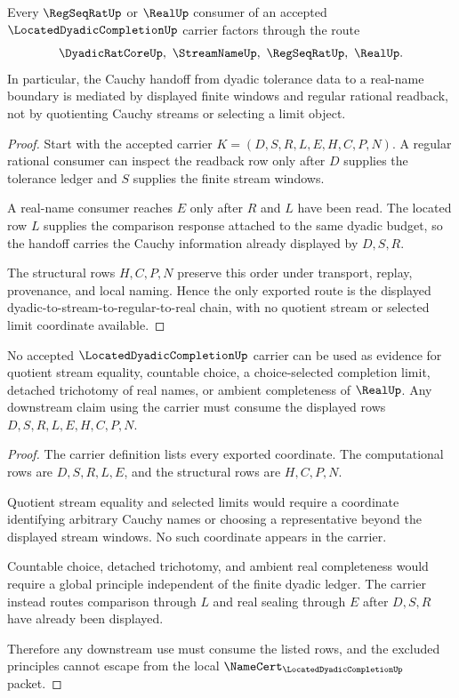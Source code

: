 \begin{theorem}
\label{thm:located-dyadic-completion-cauchy-handoff}
Every $\RegSeqRatUp$ or $\RealUp$ consumer of an accepted $\LocatedDyadicCompletionUp$ carrier factors through the route
$$
\DyadicRatCoreUp,\ \StreamNameUp,\ \RegSeqRatUp,\ \RealUp .
$$
In particular, the Cauchy handoff from dyadic tolerance data to a real-name boundary is mediated by displayed finite windows and regular rational readback, not by quotienting Cauchy streams or selecting a limit object.
\end{theorem}
\begin{proof}
Start with the accepted carrier $K=(D,S,R,L,E,H,C,P,N)$. A regular rational consumer can inspect the readback row only after $D$ supplies the tolerance ledger and $S$ supplies the finite stream windows.

A real-name consumer reaches $E$ only after $R$ and $L$ have been read. The located row $L$ supplies the comparison response attached to the same dyadic budget, so the handoff carries the Cauchy information already displayed by $D,S,R$.

The structural rows $H,C,P,N$ preserve this order under transport, replay, provenance, and local naming. Hence the only exported route is the displayed dyadic-to-stream-to-regular-to-real chain, with no quotient stream or selected limit coordinate available.
\end{proof}

\begin{theorem}
\label{thm:located-dyadic-completion-nonescape}
No accepted $\LocatedDyadicCompletionUp$ carrier can be used as evidence for quotient stream equality, countable choice, a choice-selected completion limit, detached trichotomy of real names, or ambient completeness of $\RealUp$. Any downstream claim using the carrier must consume the displayed rows $D,S,R,L,E,H,C,P,N$.
\end{theorem}
\begin{proof}
The carrier definition lists every exported coordinate. The computational rows are $D,S,R,L,E$, and the structural rows are $H,C,P,N$.

Quotient stream equality and selected limits would require a coordinate identifying arbitrary Cauchy names or choosing a representative beyond the displayed stream windows. No such coordinate appears in the carrier.

Countable choice, detached trichotomy, and ambient real completeness would require a global principle independent of the finite dyadic ledger. The carrier instead routes comparison through $L$ and real sealing through $E$ after $D,S,R$ have already been displayed.

Therefore any downstream use must consume the listed rows, and the excluded principles cannot escape from the local $\NameCert_{\LocatedDyadicCompletionUp}$ packet.
\end{proof}

